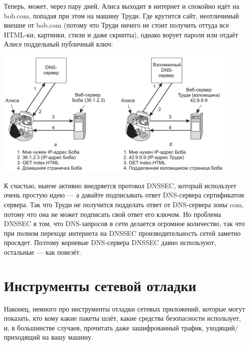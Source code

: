 \documentclass{../../text-style}
\begin{document}
Теперь, может, через пару дней, Алиса выходит в интернет и спокойно идёт на bob.com, попадая при этом на машину Труди. Где крутится сайт, неотличимый внешне от bob.com (потому что Труди ничего не стоит получить оттуда все HTML-ки, картинки, стили и даже скрипты), однако ворует пароли или отдаёт Алисе поддельный публичный ключ:

\begin{center}
    \includegraphics[width=0.9\textwidth]{dnsSpoofingResult.png}
\end{center}

К счастью, нынче активно внедряется протокол DNSSEC, который использует очень простую идею --- а давайте подписывать ответ DNS-сервера сертификатом сервера. Так что Труди не получится подделать ответ от DNS-сервера зоны com, потому что она не может подписать свой ответ его ключом. Но проблема DNSSEC в том, что DNS-запросов в сети делается огромное количество, так что при полном переходе интернета на DNSSEC производительность сетей заметно просядет. Поэтому корневые DNS-сервера DNSSEC давно используют, остальные --- как повезёт.

\section{Инструменты сетевой отладки}

Наконец, немного про инструменты отладки сетевых приложений, которые могут показать, кто кому какие пакеты шлёт, какие средства безопасности использует, и, в большинстве случаев, прочитать даже зашифрованный трафик, уходящий/приходящий на вашу машину. 
\end{document}
